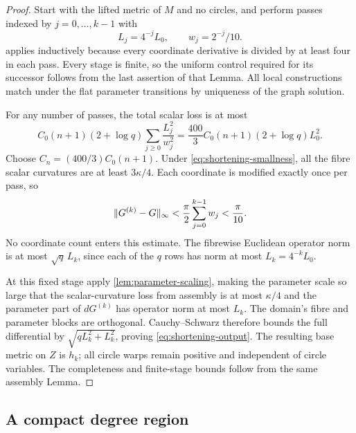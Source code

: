 \begin{proof}
Start with the lifted metric of $M$ and no circles, and perform passes indexed by $j=0,\ldots,k-1$ with
\begin{equation}\label{eq:pass-schedule}
 L_j=4^{-j}L_0,\qquad w_j=2^{-j}/10.
\end{equation}
 applies inductively because every coordinate derivative is divided by at least four in each pass. Every stage is finite, so the uniform control required for its successor follows from the last assertion of that Lemma. All local constructions match under the flat parameter transitions by uniqueness of the graph solution.

For any number of passes, the total scalar loss is at most
\[
 C_0(n+1)(2+\log q)\sum_{j\ge0}\frac{L_j^2}{w_j^2}
   =\frac{400}{3}C_0(n+1)(2+\log q)L_0^2.
\]
Choose $C_n=(400/3)C_0(n+1)$. Under
\eqref{eq:shortening-smallness}, all the fibre scalar curvatures are at least $3\kappa/4$. Each coordinate is modified exactly once per pass, so
\[
 \lVert G^{(k)}-G\rVert_{\infty}
   <\frac\pi2\sum_{j=0}^{k-1}w_j<\frac\pi{10}.
\]
No coordinate count enters this estimate. The fibrewise Euclidean operator norm is at most $\sqrt q\,L_k$, since each of the $q$ rows has norm at most $L_k=4^{-k}L_0$.

At this fixed stage apply \cref{lem:parameter-scaling}, making the parameter scale so large that the scalar-curvature loss from assembly is at most $\kappa/4$ and the parameter part of $dG^{(k)}$ has operator norm at most $L_k$. The domain's fibre and parameter blocks are orthogonal. Cauchy--Schwarz therefore bounds the full differential by
$\sqrt{qL_k^2+L_k^2}$, proving \eqref{eq:shortening-output}. The resulting base metric on $Z$ is $h_k$; all circle warps remain positive and independent of circle variables. The completeness and finite-stage bounds follow from the same assembly Lemma.
\end{proof}

\subsection{A compact degree region}

